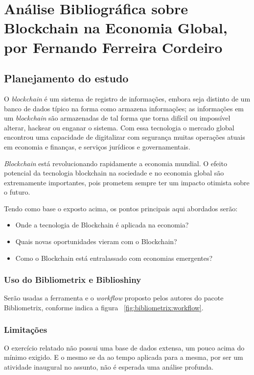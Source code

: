 \chapter{Análise Bibliográfica sobre Blockchain na Economia Global, por Fernando Ferreira Cordeiro\label{chap:bibliometria:FernandoCordeiro}}

\section{Planejamento do estudo}

O \textit{blockchain} é um sistema de registro de informações, embora seja distinto de um banco de dados típico na forma como armazena informações; as informações em um \textit{blockchain} são armazenadas de tal forma que torna difícil ou impossível alterar, hackear ou enganar o sistema. 
Com essa tecnologia o mercado global encontrou uma capacidade de digitalizar com segurança muitas operações atuais em economia e finanças, e serviços jurídicos e governamentais.

\textit{Blockchain} está revolucionando rapidamente a economia mundial. O efeito potencial da tecnologia blockchain  na sociedade e no economia global são extremamente importantes, pois prometem sempre ter um impacto otimista sobre o futuro.

Tendo como base o exposto acima, os pontos principais aqui abordados serão:
\begin{itemize}
    \item Onde a tecnologia de Blockchain é aplicada na economia?
    \item Quais novas oportunidades vieram com o Blockchain?
    \item Como o Blockchain está entralassado com economias emergentes?
\end{itemize}

\subsection{Uso do Bibliometrix e Biblioshiny}
Serão usadas a ferramenta e o \textit{workflow} proposto pelos autores do pacote Bibliometrix, conforme indica a figura ~\ref{fig:bibliometrix:workflow}.

\subsection{Limitações} O exercício relatado não possui uma base de dados extensa, um pouco acima do mínimo exigido. E o mesmo se da ao tempo aplicada para a mesma, por ser um atividade inaugural no assunto, não é esperada uma análise profunda.


